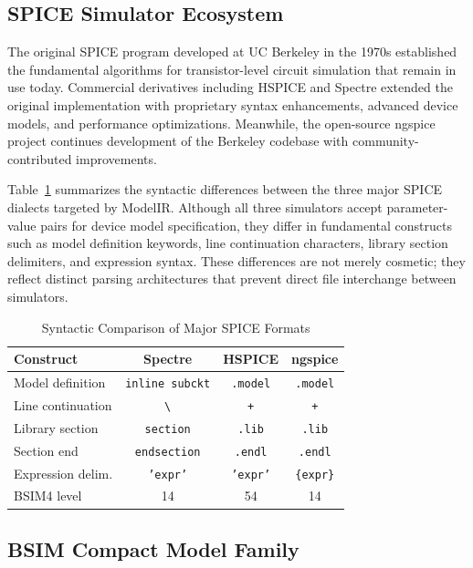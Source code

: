 \documentclass[conference]{IEEEtran}
\begin{document}
\subsection{SPICE Simulator Ecosystem}

The original SPICE program developed at UC Berkeley in the 1970s established the fundamental algorithms for transistor-level circuit simulation that remain in use today. Commercial derivatives including HSPICE and Spectre extended the original implementation with proprietary syntax enhancements, advanced device models, and performance optimizations. Meanwhile, the open-source ngspice project continues development of the Berkeley codebase with community-contributed improvements.

Table~\ref{tab:simulators} summarizes the syntactic differences between the three major SPICE dialects targeted by ModelIR. Although all three simulators accept parameter-value pairs for device model specification, they differ in fundamental constructs such as model definition keywords, line continuation characters, library section delimiters, and expression syntax. These differences are not merely cosmetic; they reflect distinct parsing architectures that prevent direct file interchange between simulators.

\begin{table}[!t]
\caption{Syntactic Comparison of Major SPICE Formats}
\label{tab:simulators}
\centering
\renewcommand{\arraystretch}{1.15}
\begin{tabular}{@{}lccc@{}}
\toprule
\textbf{Construct} & \textbf{Spectre} & \textbf{HSPICE} & \textbf{ngspice} \\
\midrule
Model definition & \texttt{inline subckt} & \texttt{.model} & \texttt{.model} \\
Line continuation & \texttt{\textbackslash} & \texttt{+} & \texttt{+} \\
Library section & \texttt{section} & \texttt{.lib} & \texttt{.lib} \\
Section end & \texttt{endsection} & \texttt{.endl} & \texttt{.endl} \\
Expression delim. & \texttt{'expr'} & \texttt{'expr'} & \texttt{\{expr\}} \\
BSIM4 level & 14 & 54 & 14 \\
\bottomrule
\end{tabular}
\end{table}

\subsection{BSIM Compact Model Family}
\end{document}
